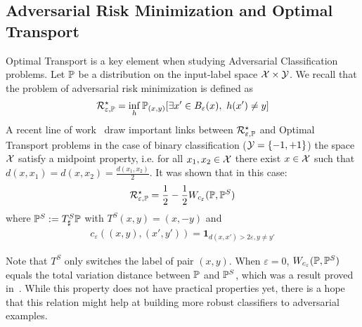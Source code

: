 
\subsection{Adversarial Risk Minimization and Optimal Transport} Optimal Transport is a key element when studying Adversarial Classification problems. Let $\mathbb{P}$ be a distribution on the input-label space $\mathcal{X}\times\mathcal{Y}$. We recall that the problem of adversarial risk minimization is defined as
\begin{align*}
    \risk_{\varepsilon,\PP}^\star = \inf_{h} \PP_{(x,y)}\left[\exists x'\in B_\varepsilon(x),~h(x')\neq y\right]
\end{align*}
A recent line of work~\citep{bhagoji2019lower,pydi2019adversarial,trillos2020adversarial} draw important links between   $\mathcal{R}_{\varepsilon,\mathbb{P}}^\star$ and Optimal Transport problems in the case of binary classification ($\mathcal{Y}=\{-1,+1\}$) the space $\mathcal{X}$ satisfy a midpoint property, i.e. for all $x_1,x_2\in\mathcal{X}$ there exist $x\in\mathcal{X}$ such that $d(x,x_1) = d(x,x_2) =\frac{d(x_1,x_2)}{2}$. It was shown that in this case:
\begin{align*}
\mathcal{R}_{\varepsilon,\mathbb{P}}^\star = \frac12-\frac12 W_{c_\varepsilon}(\mathbb{P},\mathbb{P}^S)
\end{align*}
where $\mathbb{P}^S := T^S_\sharp \mathbb{P}$ with $T^S(x,y) = (x,-y)$ and
\begin{align*}
    c_\varepsilon\left((x,y),(x',y')\right) = \mathbf{1}_{d(x,x')>2\varepsilon,y\neq y'}
\end{align*}

Note that $T^S$ only switches the label of pair $(x,y)$. When $\varepsilon=0$, $W_{c_\varepsilon}(\mathbb{P},\mathbb{P}^S)$ equals the total variation distance between $\mathbb{P}$ and $\mathbb{P}^S$, which was a result proved in~\citep{trillos2020adversarial}.
While this property does not have practical properties yet, there is a hope that this relation might help at building more robust classifiers to adversarial examples. 

